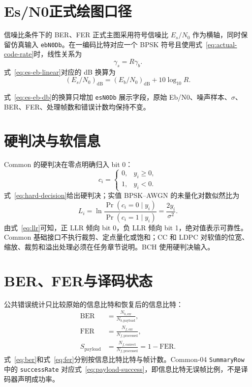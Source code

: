 \section{Es/N0正式绘图口径}

信噪比条件下的 BER、FER 正式主图采用符号信噪比 $E_s/N_0$ 作为横轴，同时保留仿真输入 \texttt{ebN0Db}。在一编码比特对应一个 BPSK 符号且使用式~\eqref{eq:actual-code-rate}时，线性关系为
\begin{equation}
  \gamma_s=R\gamma_b.
  \label{eq:es-eb-linear}
\end{equation}
式~\eqref{eq:es-eb-linear}对应的 dB 换算为
\begin{equation}
  (E_s/N_0)_{\mathrm{dB}}
  =(E_b/N_0)_{\mathrm{dB}}+10\log_{10}R.
  \label{eq:es-eb-db}
\end{equation}

式~\eqref{eq:es-eb-db}的换算只增加 \texttt{esN0Db} 展示字段，原始 Eb/N0、噪声样本、$\sigma$、BER、FER、处理帧数和错误计数均保持不变。

\section{硬判决与软信息}

Common 的硬判决在零点明确归入 bit 0：
\begin{equation}
  \hat c_i=
  \begin{cases}
    0, & y_i\ge 0,\\
    1, & y_i<0.
  \end{cases}
  \label{eq:hard-decision}
\end{equation}
式~\eqref{eq:hard-decision}给出硬判决；实值 BPSK--AWGN 的未量化对数似然比为
\begin{equation}
  L_i=\ln\frac{\Pr(c_i=0\mid y_i)}{\Pr(c_i=1\mid y_i)}
     =\frac{2y_i}{\sigma^2}.
  \label{eq:llr}
\end{equation}
由式~\eqref{eq:llr}可知，正 LLR 倾向 bit 0，负 LLR 倾向 bit 1，绝对值表示可靠性。Common 基础接口不执行裁剪、定点量化或饱和；CC 和 LDPC 对软值的位宽、缩放、裁剪和溢出处理必须在任务章节说明。BCH 使用硬判决输入。

\section{BER、FER与译码状态}

公共错误统计只比较原始的信息比特和恢复后的信息比特：
\begin{align}
  \mathrm{BER}&=\frac{N_{b,\mathrm{err}}}{N_{b,\mathrm{payload}}},
  \label{eq:ber}\\
  \mathrm{FER}&=\frac{N_{f,\mathrm{err}}}{N_{f,\mathrm{processed}}},
  \label{eq:fer}\\
  S_{\mathrm{payload}}&=\frac{N_{f,\mathrm{correct}}}{N_{f,\mathrm{processed}}}
  =1-\mathrm{FER}.
  \label{eq:payload-success}
\end{align}
式~\eqref{eq:ber}和式~\eqref{eq:fer}分别按信息比特比特与帧计数。Common-04 \texttt{SummaryRow} 中的 \texttt{successRate} 对应式~\eqref{eq:payload-success}，即信息比特无误帧比例，不是译码器声明成功率。

